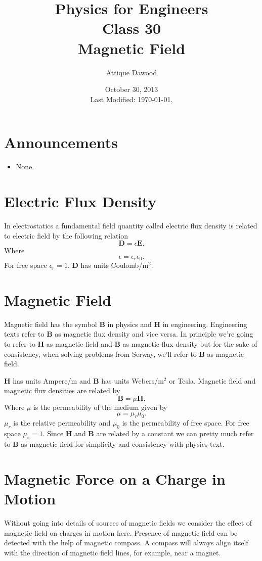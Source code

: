 \documentclass[12pt,a4paper]{article}
\title{\vspace{-3cm}Physics for Engineers\\Class 30\\Magnetic Field}
\author{Attique Dawood}
\date{October 30, 2013\\[0.2cm] Last Modified: \today, \currenttime}
\begin{document}
\maketitle
\section{Announcements}
\begin{itemize}
\item None.
\end{itemize}
\section{Electric Flux Density}
In electrostatics a fundamental field quantity called electric flux density is related to electric field by the following relation
\begin{equation}
\textbf{D}=\epsilon\textbf{E}.
\end{equation}
Where
\begin{equation}
\epsilon=\epsilon_r\epsilon_0.
\end{equation}
For free space $\epsilon_r=1$. \textbf{D} has units Coulomb/m$^2$.
\section{Magnetic Field}
Magnetic field has the symbol \textbf{B} in physics and \textbf{H} in engineering. Engineering texts refer to \textbf{B} as magnetic flux density and vice versa. In principle we're going to refer to \textbf{H} as magnetic field and \textbf{B} as magnetic flux density but for the sake of consistency, when solving problems from Serway, we'll refer to \textbf{B} as magnetic field.

\textbf{H} has units Ampere/m and \textbf{B} has units Webers/m$^2$ or Tesla. Magnetic field and magnetic flux densities are related by
\begin{equation}
\textbf{B}=\mu\textbf{H}.
\end{equation}
Where $\mu$ is the permeability of the medium given by
\begin{equation}
\mu=\mu_r\mu_0.
\end{equation}
$\mu_r$ is the relative permeability and $\mu_0$ is the permeability of free space. For free space $\mu_r=1$. Since \textbf{H} and \textbf{B} are related by a constant we can pretty much refer to \textbf{B} as magnetic field for simplicity and consistency with physics text.
\section{Magnetic Force on a Charge in Motion}
Without going into details of sources of magnetic fields we consider the effect of magnetic field on charges in motion here. Presence of magnetic field can be detected with the help of magnetic compass. A compass will always align itself with the direction of magnetic field lines, for example, near a magnet.
\end{document}
